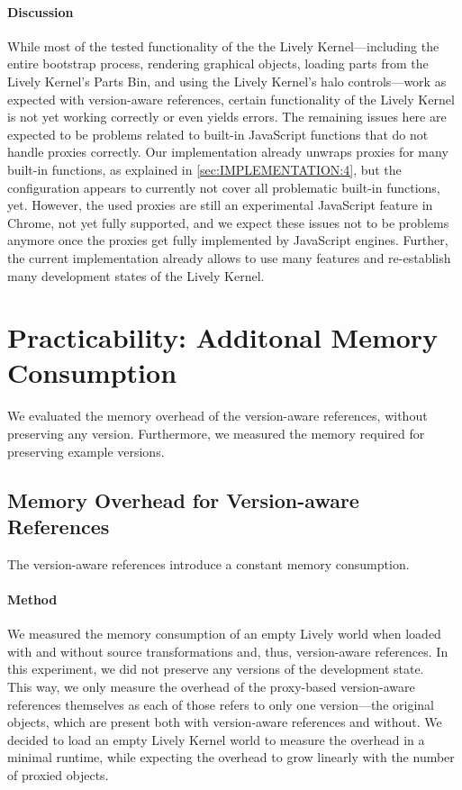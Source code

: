 \paragraph{Discussion}
While most of the tested functionality of the the Lively Kernel---including the entire bootstrap process, rendering graphical objects, loading parts from the Lively Kernel's Parts Bin, and using the Lively Kernel's halo controls---work as expected with version-aware references, certain functionality of the Lively Kernel is not yet working correctly or even yields errors.
The remaining issues here are expected to be problems related to built-in JavaScript functions that do not handle proxies correctly.
Our implementation already unwraps proxies for many built-in functions, as explained in \ref{sec:IMPLEMENTATION:4}, but the configuration appears to currently not cover all problematic built-in functions, yet.
However, the used proxies are still an experimental JavaScript feature in Chrome, not yet fully supported, and we expect these issues not to be problems anymore once the proxies get fully implemented by JavaScript engines.
Further, the current implementation already allows to use many features and re-establish many development states of the Lively Kernel.




\section{Practicability: Additonal Memory Consumption} \label{sec:EVALUATION:3}

We evaluated the memory overhead of the version-aware references, without preserving any version.
Furthermore, we measured the memory required for preserving example versions.

\subsection{Memory Overhead for Version-aware References}

The version-aware references introduce a constant memory consumption.

\paragraph{Method}
We measured the memory consumption of an empty Lively world when loaded with and without source transformations and, thus, version-aware references.
In this experiment, we did not preserve any versions of the development state.\\
This way, we only measure the overhead of the proxy-based version-aware references themselves as each of those refers to only one version---the original objects, which are present both with version-aware references and without.
We decided to load an empty Lively Kernel world to measure the overhead in a minimal runtime, while expecting the overhead to grow linearly with the number of proxied objects.

